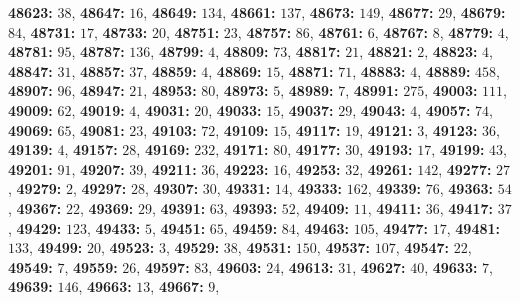 \textsf{\bfseries 48623:} $38$, \textsf{\bfseries 48647:} $16$, \textsf{\bfseries 48649:} $134$, \textsf{\bfseries 48661:} $137$, \textsf{\bfseries 48673:} $149$, \textsf{\bfseries 48677:} $29$, \textsf{\bfseries 48679:} $84$, \textsf{\bfseries 48731:} $17$, \textsf{\bfseries 48733:} $20$, \textsf{\bfseries 48751:} $23$, \textsf{\bfseries 48757:} $86$, \textsf{\bfseries 48761:} $6$, \textsf{\bfseries 48767:} $8$, \textsf{\bfseries 48779:} $4$, \textsf{\bfseries 48781:} $95$, \textsf{\bfseries 48787:} $136$, \textsf{\bfseries 48799:} $4$, \textsf{\bfseries 48809:} $73$, \textsf{\bfseries 48817:} $21$, \textsf{\bfseries 48821:} $2$, \textsf{\bfseries 48823:} $4$, \textsf{\bfseries 48847:} $31$, \textsf{\bfseries 48857:} $37$, \textsf{\bfseries 48859:} $4$, \textsf{\bfseries 48869:} $15$, \textsf{\bfseries 48871:} $71$, \textsf{\bfseries 48883:} $4$, \textsf{\bfseries 48889:} $458$, \textsf{\bfseries 48907:} $96$, \textsf{\bfseries 48947:} $21$, \textsf{\bfseries 48953:} $80$, \textsf{\bfseries 48973:} $5$, \textsf{\bfseries 48989:} $7$, \textsf{\bfseries 48991:} $275$, \textsf{\bfseries 49003:} $111$, \textsf{\bfseries 49009:} $62$, \textsf{\bfseries 49019:} $4$, \textsf{\bfseries 49031:} $20$, \textsf{\bfseries 49033:} $15$, \textsf{\bfseries 49037:} $29$, \textsf{\bfseries 49043:} $4$, \textsf{\bfseries 49057:} $74$, \textsf{\bfseries 49069:} $65$, \textsf{\bfseries 49081:} $23$, \textsf{\bfseries 49103:} $72$, \textsf{\bfseries 49109:} $15$, \textsf{\bfseries 49117:} $19$, \textsf{\bfseries 49121:} $3$, \textsf{\bfseries 49123:} $36$, \textsf{\bfseries 49139:} $4$, \textsf{\bfseries 49157:} $28$, \textsf{\bfseries 49169:} $232$, \textsf{\bfseries 49171:} $80$, \textsf{\bfseries 49177:} $30$, \textsf{\bfseries 49193:} $17$, \textsf{\bfseries 49199:} $43$, \textsf{\bfseries 49201:} $91$, \textsf{\bfseries 49207:} $39$, \textsf{\bfseries 49211:} $36$, \textsf{\bfseries 49223:} $16$, \textsf{\bfseries 49253:} $32$, \textsf{\bfseries 49261:} $142$, \textsf{\bfseries 49277:} $27$, \textsf{\bfseries 49279:} $2$, \textsf{\bfseries 49297:} $28$, \textsf{\bfseries 49307:} $30$, \textsf{\bfseries 49331:} $14$, \textsf{\bfseries 49333:} $162$, \textsf{\bfseries 49339:} $76$, \textsf{\bfseries 49363:} $54$, \textsf{\bfseries 49367:} $22$, \textsf{\bfseries 49369:} $29$, \textsf{\bfseries 49391:} $63$, \textsf{\bfseries 49393:} $52$, \textsf{\bfseries 49409:} $11$, \textsf{\bfseries 49411:} $36$, \textsf{\bfseries 49417:} $37$, \textsf{\bfseries 49429:} $123$, \textsf{\bfseries 49433:} $5$, \textsf{\bfseries 49451:} $65$, \textsf{\bfseries 49459:} $84$, \textsf{\bfseries 49463:} $105$, \textsf{\bfseries 49477:} $17$, \textsf{\bfseries 49481:} $133$, \textsf{\bfseries 49499:} $20$, \textsf{\bfseries 49523:} $3$, \textsf{\bfseries 49529:} $38$, \textsf{\bfseries 49531:} $150$, \textsf{\bfseries 49537:} $107$, \textsf{\bfseries 49547:} $22$, \textsf{\bfseries 49549:} $7$, \textsf{\bfseries 49559:} $26$, \textsf{\bfseries 49597:} $83$, \textsf{\bfseries 49603:} $24$, \textsf{\bfseries 49613:} $31$, \textsf{\bfseries 49627:} $40$, \textsf{\bfseries 49633:} $7$, \textsf{\bfseries 49639:} $146$, \textsf{\bfseries 49663:} $13$, \textsf{\bfseries 49667:} $9$, 
